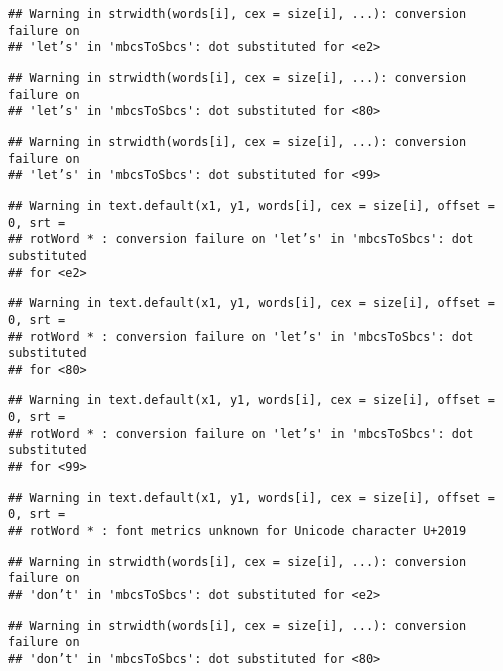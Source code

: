\documentclass[]{article}
\begin{document}
\begin{verbatim}
## Warning in strwidth(words[i], cex = size[i], ...): conversion failure on
## 'let’s' in 'mbcsToSbcs': dot substituted for <e2>
\end{verbatim}

\begin{verbatim}
## Warning in strwidth(words[i], cex = size[i], ...): conversion failure on
## 'let’s' in 'mbcsToSbcs': dot substituted for <80>
\end{verbatim}

\begin{verbatim}
## Warning in strwidth(words[i], cex = size[i], ...): conversion failure on
## 'let’s' in 'mbcsToSbcs': dot substituted for <99>
\end{verbatim}

\begin{verbatim}
## Warning in text.default(x1, y1, words[i], cex = size[i], offset = 0, srt =
## rotWord * : conversion failure on 'let’s' in 'mbcsToSbcs': dot substituted
## for <e2>
\end{verbatim}

\begin{verbatim}
## Warning in text.default(x1, y1, words[i], cex = size[i], offset = 0, srt =
## rotWord * : conversion failure on 'let’s' in 'mbcsToSbcs': dot substituted
## for <80>
\end{verbatim}

\begin{verbatim}
## Warning in text.default(x1, y1, words[i], cex = size[i], offset = 0, srt =
## rotWord * : conversion failure on 'let’s' in 'mbcsToSbcs': dot substituted
## for <99>
\end{verbatim}

\begin{verbatim}
## Warning in text.default(x1, y1, words[i], cex = size[i], offset = 0, srt =
## rotWord * : font metrics unknown for Unicode character U+2019
\end{verbatim}

\begin{verbatim}
## Warning in strwidth(words[i], cex = size[i], ...): conversion failure on
## 'don’t' in 'mbcsToSbcs': dot substituted for <e2>
\end{verbatim}

\begin{verbatim}
## Warning in strwidth(words[i], cex = size[i], ...): conversion failure on
## 'don’t' in 'mbcsToSbcs': dot substituted for <80>
\end{verbatim}
\end{document}
